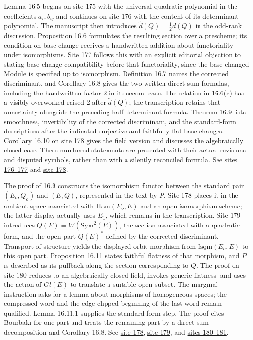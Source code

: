 \documentclass[10pt,a4paper]{article}
\begin{document}
Lemma 16.5 begins on site 175 with the universal quadratic polynomial in the coefficients \(a_i,b_{ij}\) and continues on site 176 with the content of its determinant polynomial. The manuscript then introduces \(\widetilde d(Q)=\tfrac12d(Q)\) in the odd-rank discussion. Proposition 16.6 formulates the resulting section over a prescheme; its condition on base change receives a handwritten addition about functoriality under isomorphisms. Site 177 follows this with an explicit editorial objection to stating base-change compatibility before that functoriality, since the base-changed Module is specified up to isomorphism. Definition 16.7 names the corrected discriminant, and Corollary 16.8 gives the two written direct-sum formulas, including the handwritten factor 2 in its second case. The relation in 16.6(c) has a visibly overworked raised 2 after \(\widetilde d(Q)\); the transcription retains that uncertainty alongside the preceding half-determinant formula. Theorem 16.9 lists smoothness, invertibility of the corrected discriminant, and the standard-form descriptions after the indicated surjective and faithfully flat base changes. Corollary 16.10 on site 178 gives the field version and discusses the algebraically closed case. These numbered statements are presented with their actual revisions and disputed symbols, rather than with a silently reconciled formula. See \href{https://grothendieck.umontpellier.fr/web/viewer.html?file=../25.pdf#page=177}{sites 176--177} and \href{https://grothendieck.umontpellier.fr/web/viewer.html?file=../25.pdf#page=179}{site 178}.

The proof of 16.9 constructs the isomorphism functor between the standard pair \((E_o,Q_o)\) and \((E,Q)\), represented in the text by \(P\). Site 178 places it in the ambient space associated with \(\underline{\mathrm{Hom}}(E_o,E)\) and an open isomorphism scheme; the latter display actually uses \(E_1\), which remains in the transcription. Site 179 introduces \(\underline Q(E)=W(\underline{\mathrm{Sym}}^2(E))\), the section associated with a quadratic form, and the open part \(\underline Q(E)^*\) defined by the corrected discriminant. Transport of structure yields the displayed orbit morphism from \(\underline{\mathrm{Isom}}(E_o,E)\) to this open part. Proposition 16.11 states faithful flatness of that morphism, and \(P\) is described as its pullback along the section corresponding to \(Q\). The proof on site 180 reduces to an algebraically closed field, invokes generic flatness, and uses the action of \(Gl(E)\) to translate a suitable open subset. The marginal instruction asks for a lemma about morphisms of homogeneous spaces; the compressed word and the edge-clipped beginning of the last word remain qualified. Lemma 16.11.1 supplies the standard-form step. The proof cites Bourbaki for one part and treats the remaining part by a direct-sum decomposition and Corollary 16.8. See \href{https://grothendieck.umontpellier.fr/web/viewer.html?file=../25.pdf#page=179}{site 178}, \href{https://grothendieck.umontpellier.fr/web/viewer.html?file=../25.pdf#page=180}{site 179}, and \href{https://grothendieck.umontpellier.fr/web/viewer.html?file=../25.pdf#page=181}{sites 180--181}.
\end{document}

